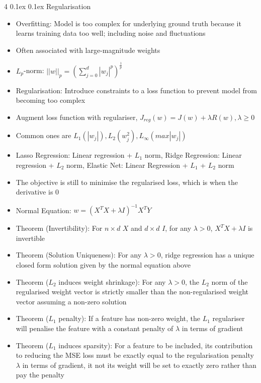\documentclass[10pt, landscape]{article}
\makeatletter
\renewcommand{\section}{\@startsection{section}{1}{0mm}%
  {0.1ex} %
  {0.1ex} %
  {\normalfont\large\bfseries}}
\makeatother
\begin{document}
\begin{multicols*}{4}
\section{Regularisation}
\begin{itemize}
    \item Overfitting: Model is too complex for underlying ground truth because it learns training data too well; including noise and fluctuations
    \item Often associated with large-magnitude weights
    \item $L_p$-norm: $||w||_p=(\sum_{j=0}^d|w_j|^p)^\frac{1}{p}$
    \item Regularisation: Introduce constraints to a loss function to prevent model from becoming too complex
    \item Augment loss function with regulariser, $J_{reg}(w)=J(w)+\lambda R(w), \lambda \geq 0$
    \item Common ones are $L_1 (|w_j|), L_2 (w_j^2), L_\infty (max|w_j|)$
    \item Lasso Regression: Linear regression + $L_1$ norm, Ridge Regression: Linear regression + $L_2$ norm, Elastic Net: Linear Regression + $L_1$ + $L_2$ norm
    \item The objective is still to minimise the regularised loss, which is when the derivative is 0
    \item Normal Equation: $w=(X^TX+\lambda I)^{-1}X^TY$
    \item Theorem (Invertibility): For $n \times d$ $X$ and $d\times d$ $I$, for any $\lambda > 0$, $X^TX+\lambda I$ is invertible
    \item Theorem (Solution Uniqueness): For any $\lambda >0$, ridge regression has a unique closed form solution given by the normal equation above
    \item Theorem ($L_2$ induces weight shrinkage): For any $\lambda > 0$, the $L_2$ norm of the regularised weight vector is strictly smaller than the non-regularised weight vector assuming a non-zero solution
    \item Theorem ($L_1$ penalty): If a feature has non-zero weight, the $L_1$ regulariser will penalise the feature with a constant penalty of $\lambda$ in terms of gradient
    \item Theorem ($L_1$ induces sparsity): For a feature to be included, its contribution to reducing the MSE loss must be exactly equal to the regularisation penalty $\lambda$ in terms of gradient, it not its weight will be set to exactly zero rather than pay the penalty
\end{itemize}


\end{multicols*}
\end{document}
